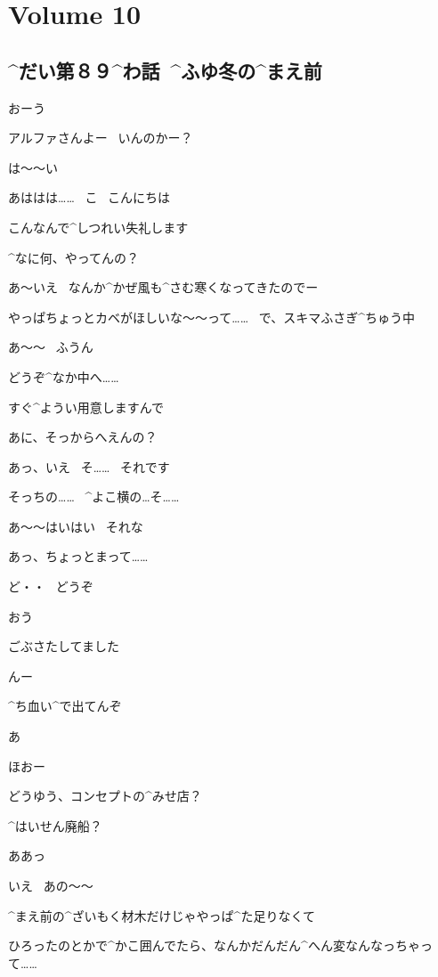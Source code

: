 \section{Volume 10}

\subsection{^{だい}{第}８９^{わ}{話}\ ^{ふゆ}{冬}の^{まえ}{前}}

\page[6]
\Ojisan おーう

\Ojisan アルファさんよー
\ いんのかー？

\page[7]
\Alpha は〜〜い

\Alpha あははは……
\ こ
\ こんにちは

\Alpha こんなんで^{しつれい}{失礼}します

\Ojisan ^{なに}{何}、やってんの？

\Alpha あ〜いえ
\ なんか^{かぜ}{風}も^{さむ}{寒}くなってきたのでー

\Alpha やっぱちょっとカベがほしいな〜〜って……
\ で、スキマふさぎ^{ちゅう}{中}

\Ojisan あ〜〜
\ ふうん

\page[8]
\Alpha どうぞ^{なか}{中}へ……

\Alpha すぐ^{ようい}{用意}しますんで

\Ojisan あに、そっからへえんの？

\Alpha あっ、いえ
\ そ……
\ それです

\Alpha そっちの……
\ ^{よこ}{横}の…そ……

\Ojisan あ〜〜はいはい
\ それな

\Alpha あっ、ちょっとまって……

\page[9]
\Alpha ど・・
\ どうぞ

\Ojisan おう

\Alpha ごぶさたしてました

\Ojisan んー

\Ojisan ^{ち}{血}い^{で}{出}てんぞ

\Alpha あ

\page[10]
\Ojisan ほおー

\Ojisan どうゆう、コンセプトの^{みせ}{店}？

\Ojisan ^{はいせん}{廃船}？

\Alpha ああっ

\Alpha いえ
\ あの〜〜

\page[11]
\Alpha ^{まえ}{前}の^{ざいもく}{材木}だけじゃやっぱ^{た}{足}りなくて

\Alpha ひろったのとかで^{かこ}{囲}んでたら、なんかだんだん^{へん}{変}なんなっちゃって……

